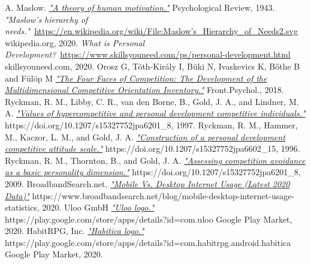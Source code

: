 \documentclass[twoside]{ctuthesis}
\begin{document}
    
    \begin{thebibliography}{99}
         A. Maslow. \href{http://psychclassics.yorku.ca/Maslow/motivation.htm}{\emph{"A theory of human motivation."}} Psychological Review, 1943.
         \emph{"Maslow's hierarchy of needs."}~\href{https://en.wikipedia.org/wiki/File:Maslow's_Hierarchy_of_Needs2.svg}{https://en.wikipedia.org/wiki/File:Maslow's\_Hierarchy\_of\_Needs2.svg} wikipedia.org, 2020.
         \emph{What is Personal Development?}~\href{https://www.skillsyouneed.com/ps/personal-development.html}{https://www.skillsyouneed.com/ps/personal-development.html} skillsyouneed.com, 2020.
         Orosz G, Tóth-Király I, Büki N, Ivaskevics K, Bőthe B and Fülöp M \href{https://www.frontiersin.org/articles/10.3389/fpsyg.2018.00779/full}{\emph{"The Four Faces of Competition: The Development of the Multidimensional Competitive Orientation Inventory."}} Front.Psychol., 2018.
         Ryckman, R. M., Libby, C. R., van den Borne, B., Gold, J. A., and Lindner, M. A. \href{https://doi.org/10.1207/s15327752jpa6201_8}{\emph{"Values of hypercompetitive and personal development competitive individuals."}} https://doi.org/10.1207/s15327752jpa6201\_8, 1997.
         Ryckman, R. M., Hammer, M., Kaczor, L. M., and Gold, J. A. \href{https://doi.org/10.1207/s15327752jpa6602_15}{\emph{"Construction of a personal development competitive attitude scale."}} https://doi.org/10.1207/s15327752jpa6602\_15, 1996.
         Ryckman, R. M., Thornton, B., and Gold, J. A. \href{https://doi.org/10.1207/s15327752jpa6201_8}{\emph{"Assessing competition avoidance as a basic personality dimension."}} https://doi.org/10.1207/s15327752jpa6201\_8, 2009.
         BroadbandSearch.net, \href{https://www.broadbandsearch.net/blog/mobile-desktop-internet-usage-statistics}{\emph{"Mobile Vs. Desktop Internet Usage (Latest 2020 Data)"}} https://www.broadbandsearch.net/blog/mobile-desktop-internet-usage-statistics, 2020.
         Uloo GmbH \href{https://play.google.com/store/apps/details?id=com.uloo}{\emph{"Uloo logo."}} https://play.google.com/store/apps/details?id=com.uloo Google Play Market, 2020.
         HabitRPG, Inc. \href{https://play.google.com/store/apps/details?id=com.habitrpg.android.habitica}{\emph{"Habitica logo."}} https://play.google.com/store/apps/details?id=com.habitrpg.android.habitica Google Play Market, 2020.

\end{thebibliography}
\end{document}
